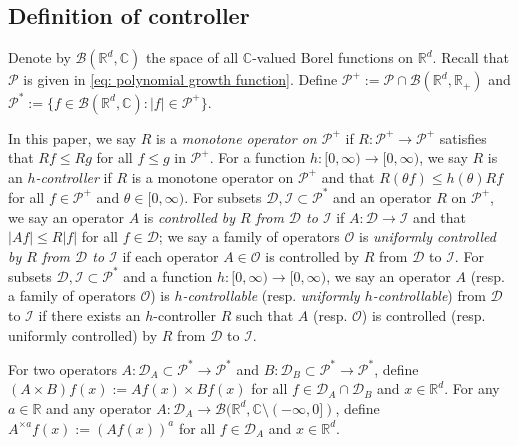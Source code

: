 \documentclass[EJP]{ejpecp} %
\begin{document}
\subsection{Definition of controller}
\label{sec: controller}
	Denote by $\mathcal B(\mathbb R^d, \mathbb C)$ the space of all $\mathbb C$-valued Borel functions on $\mathbb R^d$.
	Recall that $\mathcal P$ is given in \eqref{eq: polynomial growth function}.
	Define $\mathcal P^+:= \mathcal P \cap \mathcal B(\mathbb R^d, \mathbb R_+)$ and $\mathcal P^*:= \{f\in \mathcal B(\mathbb R^d, \mathbb C): |f|\in \mathcal P^+\}$.

	In this paper, we say $R$ is a \emph{monotone operator on $\mathcal P^+$} if $R:\mathcal P^+ \to \mathcal P^+$ satisfies that $Rf\leq Rg$ for all $f\leq g$ in $\mathcal P^+$.
	For a function $h: [0,\infty) \to [0,\infty)$, we say $R$ is an \emph{$h$-controller} if $R$ is a monotone operator on $\mathcal P^+$ and that $R(\theta f)\leq h(\theta) Rf$ for all $f\in \mathcal P^+$ and $\theta \in [0,\infty)$.
	For subsets $\mathcal D, \mathcal I\subset \mathcal P^*$ and an operator $R$ on $\mathcal P^+$, we say an operator $A$ is \emph{controlled by $R$ from $\mathcal D$ to $\mathcal I$} if $A:\mathcal D \to \mathcal I$ and that $|Af| \leq R|f|$ for all $f\in \mathcal D$;
	we say a family of operators $\mathscr O$ is \emph{uniformly controlled by $R$ from $\mathcal D$ to $\mathcal I$} if each operator $A\in \mathscr O$  is controlled by $R$ from $\mathcal D$ to $\mathcal I$.
	For subsets $\mathcal D, \mathcal I\subset \mathcal P^*$ and a function $h:[0,\infty) \to [0,\infty)$, we say an operator $A$ (resp. a family of operators $\mathscr O$) is \emph{$h$-controllable} (resp. \emph{uniformly $h$-controllable}) from $\mathcal D$ to $\mathcal I$ if there exists an $h$-controller $R$ such that $A$ (resp. $\mathscr O$) is controlled (resp. uniformly controlled) by $R$ from $\mathcal D$ to $\mathcal I$.

	For two operators $A: \mathcal D_A \subset \mathcal P^*\to \mathcal P^*$ and $B: \mathcal D_B \subset \mathcal P^*\to \mathcal P^*$, define $(A \times B)f (x):= Af(x) \times Bf(x)$ for all $f\in \mathcal D_A \cap \mathcal D_B$ and $x\in \mathbb{R}^d$.
	For any $a \in \mathbb R$ and any operator $A :\mathcal D_A \to \mathcal B(\mathbb R^d, \mathbb C\setminus (-\infty, 0])$, define $A^{\times a}f(x):= (Af(x))^a$ for all $f\in \mathcal D_A$ and $x\in \mathbb R^d$.
\end{document}

